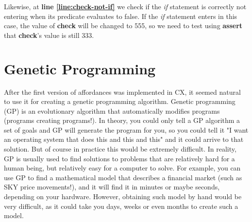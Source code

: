 \documentclass[11pt,fleqn,openany]{book} %
\begin{document}
Likewise, at \textbf{line \ref{line:check-not-if}} we check if the \emph{if} statement is correctly not entering when its predicate evaluates to false. If the \emph{if} statement enters in this case, the value of \textbf{check} will be changed to 555, so we need to test using \textbf{assert} that \textbf{check}'s value is still 333.


\chapter{Genetic Programming}
\label{chapter:genetic-programming}


After the first version of affordances was implemented in CX, it seemed natural to use it for creating a genetic programming algorithm. Genetic programming (GP) is an evolutionary algorithm that automatically modifies programs (programs creating programs!). In theory, you could only tell a GP algorithm a set of goals and GP will generate the program for you, so you could tell it "I want an operating system that does this and this and this" and it could arrive to that solution. But of course in practice this would be extremely difficult. In reality, GP is usually used to find solutions to problems that are relatively hard for a human being, but relatively easy for a computer to solve. For example, you can use GP to find a mathematical model that describes a financial market (such as SKY price movements!), and it will find it in minutes or maybe seconds, depending on your hardware. However, obtaining such model by hand would be very difficult, as it could take you days, weeks or even months to create such a model.
\end{document}
